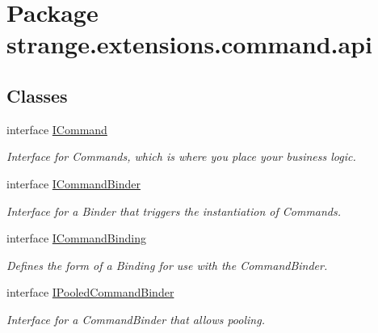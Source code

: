 \hypertarget{namespacestrange_1_1extensions_1_1command_1_1api}{\section{Package strange.\-extensions.\-command.\-api}
\label{namespacestrange_1_1extensions_1_1command_1_1api}
}
\subsection*{Classes}
\begin{DoxyCompactItemize}
\item 
interface \hyperlink{interfacestrange_1_1extensions_1_1command_1_1api_1_1_i_command}{I\-Command}
\begin{DoxyCompactList}\small\item\em Interface for Commands, which is where you place your business logic. \end{DoxyCompactList}\item 
interface \hyperlink{interfacestrange_1_1extensions_1_1command_1_1api_1_1_i_command_binder}{I\-Command\-Binder}
\begin{DoxyCompactList}\small\item\em Interface for a Binder that triggers the instantiation of Commands. \end{DoxyCompactList}\item 
interface \hyperlink{interfacestrange_1_1extensions_1_1command_1_1api_1_1_i_command_binding}{I\-Command\-Binding}
\begin{DoxyCompactList}\small\item\em Defines the form of a Binding for use with the Command\-Binder. \end{DoxyCompactList}\item 
interface \hyperlink{interfacestrange_1_1extensions_1_1command_1_1api_1_1_i_pooled_command_binder}{I\-Pooled\-Command\-Binder}
\begin{DoxyCompactList}\small\item\em Interface for a Command\-Binder that allows pooling. \end{DoxyCompactList}\end{DoxyCompactItemize}
